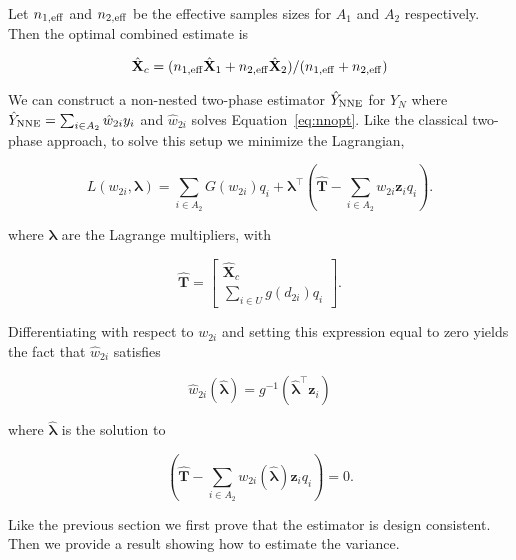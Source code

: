 \documentclass[12pt]{article}
\renewcommand{\bf}[1]{\mathbf{#1}}
\begin{document}
Let $n_{1, \rm{eff}}$ and $n_{2, \rm{eff}}$ be the effective samples sizes for
$A_1$ and $A_2$ respectively. Then the optimal combined estimate is 

$$
\hat{\bf X}_c = (n_{1, \rm{eff}} \hat{\bf X}_1 + n_{2, \rm{eff}}\hat{\bf X}_2) / 
(n_{1, \rm{eff}} + n_{2, \rm{eff}})
$$

We can construct a non-nested two-phase estimator $\hat Y_{\rm NNE}$ for $Y_N$ where
$\hat Y_{\rm NNE} = \sum_{i \in A_2} \hat w_{2i} y_i$ and $\hat w_{2i}$ solves
Equation~\ref{eq:nnopt}. Like the classical two-phase approach, to solve this
setup we minimize the Lagrangian,

\begin{equation}\label{eq:legragedc2}
  L(w_{2i}, \bm \lambda) = \sum_{i \in A_2} G(w_{2i}) q_i + 
  \bm \lambda^\top \left( \hat{\bf T} - \sum_{i \in A_2} w_{2i} \bf z_i q_i\right).
\end{equation}

where $\bm \lambda$ are the Lagrange multipliers, with 

$$\hat{\bf T} = 
\begin{bmatrix}
\hat{\bf X}_c \\ \sum_{i \in U} g(d_{2i}) q_i
\end{bmatrix}.
$$

Differentiating with respect to $w_{2i}$ and setting this expression equal to
zero yields the fact that $\hat w_{2i}$ satisfies 

$$ \hat w_{2i}(\hat{\bm \lambda}) = g^{-1}(\hat{\bm \lambda}^\top \bf z_i) $$

where $\hat{\bm \lambda}$ is the solution to

\begin{equation}\label{eq:lamdc2}
  \left( \hat{\bf T} - \sum_{i \in A_2} w_{2i}(\hat{\bm \lambda}) \bf z_i
  q_i\right) = 0.
\end{equation}

Like the previous section we first prove that the estimator is design consistent.
Then we provide a result showing how to estimate the variance.
\end{document}
